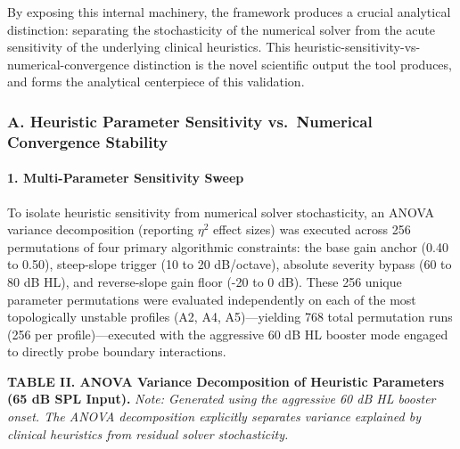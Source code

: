 \documentclass[
  12pt,
]{article}
\begin{document}
By exposing this internal machinery, the framework produces a crucial
analytical distinction: separating the stochasticity of the numerical
solver from the acute sensitivity of the underlying clinical heuristics.
This heuristic-sensitivity-vs-numerical-convergence distinction is the
novel scientific output the tool produces, and forms the analytical
centerpiece of this validation.

\subsubsection{A. Heuristic Parameter Sensitivity vs.~Numerical
Convergence
Stability}\label{a.-heuristic-parameter-sensitivity-vs.-numerical-convergence-stability}

\paragraph{1. Multi-Parameter Sensitivity
Sweep}\label{multi-parameter-sensitivity-sweep}

To isolate heuristic sensitivity from numerical solver stochasticity, an
ANOVA variance decomposition (reporting \(\eta^2\) effect sizes) was
executed across 256 permutations of four primary algorithmic
constraints: the base gain anchor (0.40 to 0.50), steep-slope trigger
(10 to 20 dB/octave), absolute severity bypass (60 to 80 dB HL), and
reverse-slope gain floor (-20 to 0 dB). These 256 unique parameter
permutations were evaluated independently on each of the most
topologically unstable profiles (A2, A4, A5)---yielding 768 total
permutation runs (256 per profile)---executed with the aggressive 60 dB
HL booster mode engaged to directly probe boundary interactions.

\textbf{TABLE II. ANOVA Variance Decomposition of Heuristic Parameters
(65 dB SPL Input).} \emph{Note: Generated using the aggressive 60 dB HL
booster onset. The ANOVA decomposition explicitly separates variance
explained by clinical heuristics from residual solver stochasticity.}
\end{document}
